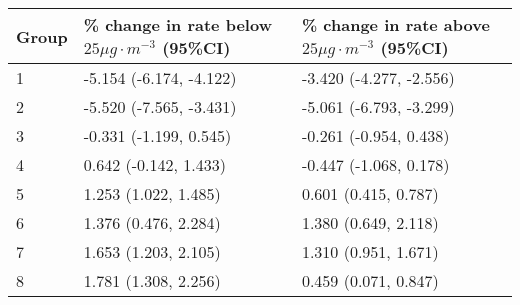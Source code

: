 \begin{tabular}{lll}
  \hline
Group & \% change in rate below $25 \mu g \cdot m^{-3}$ (95\%CI) & \% change in rate above $25 \mu g \cdot m^{-3}$ (95\%CI) \\ 
  \hline
   1 & -5.154 (-6.174, -4.122) & -3.420 (-4.277, -2.556) \\ 
     2 & -5.520 (-7.565, -3.431) & -5.061 (-6.793, -3.299) \\ 
     3 & -0.331 (-1.199, 0.545) & -0.261 (-0.954, 0.438) \\ 
     4 & 0.642 (-0.142, 1.433) & -0.447 (-1.068, 0.178) \\ 
     5 & 1.253 (1.022, 1.485) & 0.601 (0.415, 0.787) \\ 
     6 & 1.376 (0.476, 2.284) & 1.380 (0.649, 2.118) \\ 
     7 & 1.653 (1.203, 2.105) & 1.310 (0.951, 1.671) \\ 
     8 & 1.781 (1.308, 2.256) & 0.459 (0.071, 0.847) \\ 
   \hline
\end{tabular}

